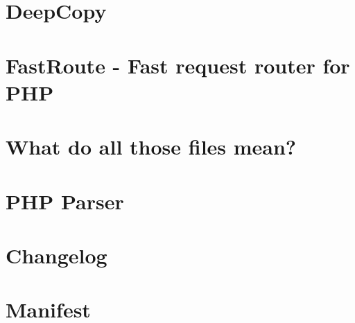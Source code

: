 \documentclass[twoside]{book}
\newcommand{\+}{\discretionary{\mbox{\scriptsize$\hookleftarrow$}}{}{}}
\begin{document}
\chapter{Deep\+Copy}
\label{md__c__workspace__proyecto__p_h_p_project_vendor_myclabs_deep_copy__r_e_a_d_m_e}

\chapter{Fast\+Route -\/ Fast request router for PHP}
\label{md__c__workspace__proyecto__p_h_p_project_vendor_nikic_fast_route__r_e_a_d_m_e}

\chapter{What do all those files mean?}
\label{md__c__workspace__proyecto__p_h_p_project_vendor_nikic_php_parser_grammar__r_e_a_d_m_e}

\chapter{PHP Parser}
\label{md__c__workspace__proyecto__p_h_p_project_vendor_nikic_php_parser__r_e_a_d_m_e}

\chapter{Changelog}
\label{md__c__workspace__proyecto__p_h_p_project_vendor_phar_io_manifest__c_h_a_n_g_e_l_o_g}

\chapter{Manifest}
\label{md__c__workspace__proyecto__p_h_p_project_vendor_phar_io_manifest__r_e_a_d_m_e}

\end{document}
